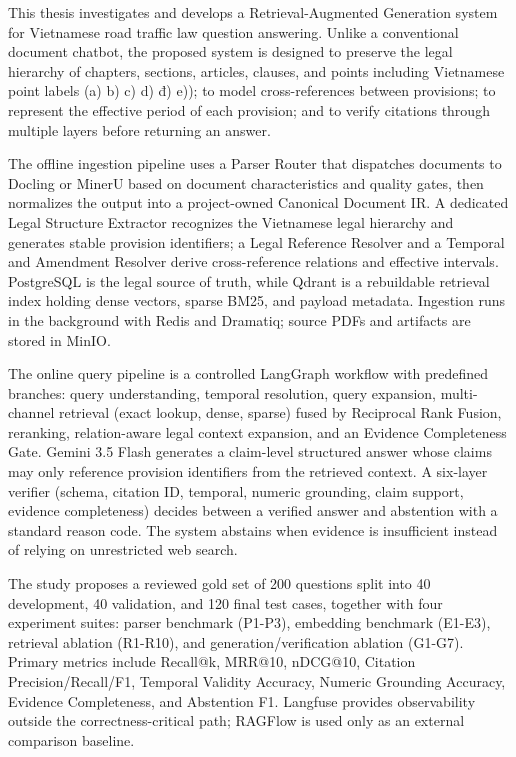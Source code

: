 \documentclass[a4paper,12pt]{extreport}
\begin{document}
This thesis investigates and develops a Retrieval-Augmented Generation system for Vietnamese road traffic law question answering. Unlike a conventional document chatbot, the proposed system is designed to preserve the legal hierarchy of chapters, sections, articles, clauses, and points including Vietnamese point labels (a) b) c) d) đ) e)); to model cross-references between provisions; to represent the effective period of each provision; and to verify citations through multiple layers before returning an answer.

The offline ingestion pipeline uses a Parser Router that dispatches documents to Docling or MinerU based on document characteristics and quality gates, then normalizes the output into a project-owned Canonical Document IR. A dedicated Legal Structure Extractor recognizes the Vietnamese legal hierarchy and generates stable provision identifiers; a Legal Reference Resolver and a Temporal and Amendment Resolver derive cross-reference relations and effective intervals. PostgreSQL is the legal source of truth, while Qdrant is a rebuildable retrieval index holding dense vectors, sparse BM25, and payload metadata. Ingestion runs in the background with Redis and Dramatiq; source PDFs and artifacts are stored in MinIO.

The online query pipeline is a controlled LangGraph workflow with predefined branches: query understanding, temporal resolution, query expansion, multi-channel retrieval (exact lookup, dense, sparse) fused by Reciprocal Rank Fusion, reranking, relation-aware legal context expansion, and an Evidence Completeness Gate. Gemini 3.5 Flash generates a claim-level structured answer whose claims may only reference provision identifiers from the retrieved context. A six-layer verifier (schema, citation ID, temporal, numeric grounding, claim support, evidence completeness) decides between a verified answer and abstention with a standard reason code. The system abstains when evidence is insufficient instead of relying on unrestricted web search.

The study proposes a reviewed gold set of 200 questions split into 40 development, 40 validation, and 120 final test cases, together with four experiment suites: parser benchmark (P1-P3), embedding benchmark (E1-E3), retrieval ablation (R1-R10), and generation/verification ablation (G1-G7). Primary metrics include Recall@k, MRR@10, nDCG@10, Citation Precision/Recall/F1, Temporal Validity Accuracy, Numeric Grounding Accuracy, Evidence Completeness, and Abstention F1. Langfuse provides observability outside the correctness-critical path; RAGFlow is used only as an external comparison baseline.
\end{document}
